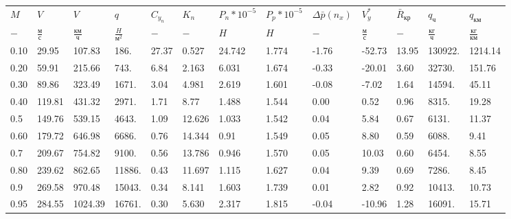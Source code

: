 \begin{tabular}{lllllllllllll}
$M$ & $V$ & $V$ & $q$ & $C_{y_n}$ & $K_n$ & $P_n*10^{-5}$ & $P_p*10^{-5}$ & $\Delta \bar{p}(n_x)$ & $V_y^*$ & $\bar{R}_{кр}$ & $q_{ч}$ & $q_{км}$ \\
$-$ & $\frac{м}{с}$ & $\frac{км}{ч}$ & $\frac{H}{м^2}$ & $-$ & $-$ & $H$ & $H$ & $-$ & $\frac{м}{с}$ & $-$ & $\frac{кг}{ч}$ & $\frac{кг}{км}$ \\
0.10 & 29.95 & 107.83 & 186. & 27.37 & 0.527 & 24.742 & 1.774 & -1.76 & -52.73 & 13.95 & 130922. & 1214.14 \\
0.20 & 59.91 & 215.66 & 743. & 6.84 & 2.163 & 6.031 & 1.674 & -0.33 & -20.01 & 3.60 & 32730. & 151.76 \\
0.30 & 89.86 & 323.49 & 1671. & 3.04 & 4.981 & 2.619 & 1.601 & -0.08 & -7.02 & 1.64 & 14594. & 45.11 \\
0.40 & 119.81 & 431.32 & 2971. & 1.71 & 8.77 & 1.488 & 1.544 & 0.00 & 0.52 & 0.96 & 8315. & 19.28 \\
0.5 & 149.76 & 539.15 & 4643. & 1.09 & 12.626 & 1.033 & 1.542 & 0.04 & 5.84 & 0.67 & 6131. & 11.37 \\
0.60 & 179.72 & 646.98 & 6686. & 0.76 & 14.344 & 0.91 & 1.549 & 0.05 & 8.80 & 0.59 & 6088. & 9.41 \\
0.7 & 209.67 & 754.82 & 9100. & 0.56 & 13.786 & 0.946 & 1.570 & 0.05 & 10.03 & 0.60 & 6454. & 8.55 \\
0.80 & 239.62 & 862.65 & 11886. & 0.43 & 11.697 & 1.115 & 1.627 & 0.04 & 9.39 & 0.69 & 7286. & 8.45 \\
0.9 & 269.58 & 970.48 & 15043. & 0.34 & 8.141 & 1.603 & 1.739 & 0.01 & 2.82 & 0.92 & 10413. & 10.73 \\
0.95 & 284.55 & 1024.39 & 16761. & 0.30 & 5.630 & 2.317 & 1.815 & -0.04 & -10.96 & 1.28 & 16091. & 15.71 \\
\end{tabular}
